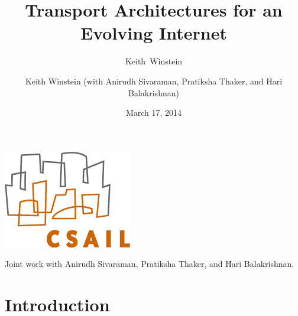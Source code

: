 \documentclass[svgnames]{beamer}
\title{Transport Architectures for an Evolving Internet}
\author{Keith~Winstein}
\institute{MIT Computer Science and Artificial Intelligence Laboratory\\\vspace{\baselineskip}\textcolor{DarkBlue}{}}
\date{March 17, 2014}
\begin{document}
\begin{frame}[plain]

\titlepage

\begin{centering}

\includegraphics[width=2 cm]{csaillogomed.png}

\vspace{\baselineskip}
\vspace{\baselineskip}

\tiny Joint work with Anirudh Sivaraman, Pratiksha Thaker, and Hari Balakrishnan.

\end{centering}

\end{frame}

\author{Keith Winstein (with Anirudh Sivaraman, Pratiksha Thaker, and Hari Balakrishnan)}

\institute{}

\section{Introduction}
\end{document}
